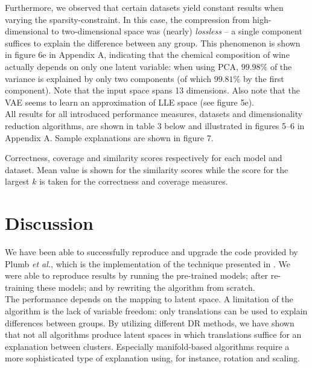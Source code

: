 Furthermore, we observed that certain datasets yield constant results when varying the sparsity-constraint. In this case, the compression from high-dimensional to two-dimensional space was (nearly) \textit{lossless} -- a single component suffices to explain the difference between any group. This phenomenon is shown in figure 6e in Appendix A, indicating that the chemical composition of wine actually depends on only one latent variable: when using PCA, $99.98\%$ of the variance is explained by only two components (of which $99.81\%$ by the first component). Note that the input space spans 13 dimensions. Also note that the VAE seems to learn an approximation of LLE space (see figure 5e).\\

All results for all introduced performance measures, datasets and dimensionality reduction algorithms, are shown in table 3 below and illustrated in figures 5--6 in Appendix A. Sample explanations are shown in figure 7.


\begin{table}[h]
  \begin{adjustwidth}{-3cm}{-3cm}
    \footnotesize
    \centering
    
  \end{adjustwidth}
  \caption{Correctness, coverage and similarity scores respectively for each model and dataset. Mean value is shown for the similarity scores while the score for the largest $k$ is taken for the correctness and coverage measures.}
\end{table}


\section{Discussion}
We have been able to successfully reproduce and upgrade the code provided by Plumb \textit{et al.}, which is the implementation of the technique presented in \citep{plumb2020explaining}. We were able to reproduce results by running the pre-trained models; after re-training these models; and by rewriting the algorithm from scratch.\\

The performance depends on the mapping to latent space. A limitation of the algorithm is the lack of variable freedom: only translations can be used to explain differences between groups. By utilizing different DR methods, we have shown that not all algorithms produce latent spaces in which translations suffice for an explanation between clusters. Especially manifold-based algorithms require a more sophisticated type of explanation using, for instance, rotation and scaling.\\


